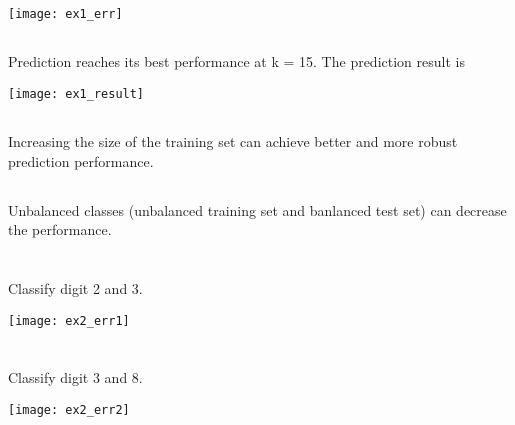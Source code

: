 \documentclass{article}[11pt]
\begin{document}
\subsection{}
\begin{center}
  \texttt{[image: ex1\_err]}
\end{center}

\subsection{}
Prediction reaches its best performance at k = 15. The prediction result is
\begin{center}
  \texttt{[image: ex1\_result]}
\end{center}

\subsection{}
Increasing the size of the training set can achieve better and more robust prediction performance.

\subsection{}
Unbalanced classes (unbalanced training set and banlanced test set) can decrease the performance.

\section{}
Classify digit 2 and 3.
\begin{center}
  \texttt{[image: ex2\_err1]}
\end{center}

\section{}
Classify digit 3 and 8.
\begin{center}
  \texttt{[image: ex2\_err2]}
\end{center}
\end{document}
